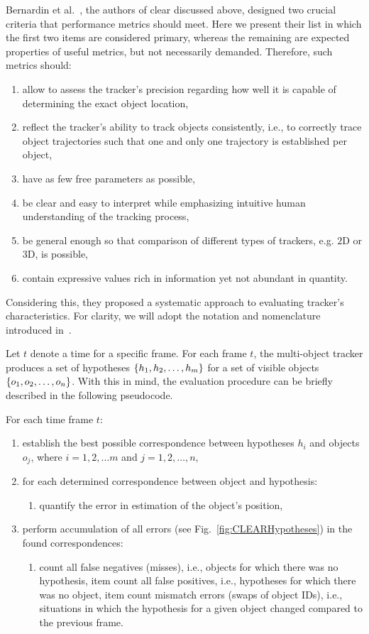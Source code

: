 Bernardin et al.~\cite{Bernardin2008}, the authors of \gls{clear} discussed above, designed two crucial criteria that performance metrics should meet. Here we present their list in which the first two items are considered primary, whereas the remaining are expected properties of useful metrics, but not necessarily demanded. Therefore, such metrics should:
\begin{enumerate}
    \item allow to assess the tracker's precision regarding how well it is capable of determining the exact object location,
    \item reflect the tracker's ability to track objects consistently, i.e., to correctly trace object trajectories such that one and only one trajectory is established per object,
    \item have as few free parameters as possible,
    \item be clear and easy to interpret while emphasizing intuitive human understanding of the tracking process,
    \item be general enough so that comparison of different types of trackers, e.g. $2$D or $3$D, is possible,
    \item contain expressive values rich in information yet not abundant in quantity.
\end{enumerate}

Considering this, they proposed a systematic approach to evaluating tracker's characteristics. For clarity, we will adopt the notation and nomenclature introduced in~\cite{Bernardin2008}.

Let $t$ denote a time for a specific frame. For each frame $t$, the multi-object tracker produces a set of hypotheses $\left\{ {h_1, h_2, \dots, h_m} \right\}$ for a set of visible objects $\left\{ {o_1, o_2, \dots, o_n} \right\}$. With this in mind, the evaluation procedure can be briefly described in the following pseudocode.

For each time frame $t$:
\begin{enumerate}
    \item establish the best possible correspondence between hypotheses $h_i$ and objects $o_j$, where $i = 1, 2, \dots m$ and $j = 1, 2, \dots, n$,
    \item for each determined correspondence between object and hypothesis:
    \begin{enumerate}
        \item quantify the error in estimation of the object's position,
    \end{enumerate}
    \item perform accumulation of all errors (see Fig.~\ref{fig:CLEARHypotheses}) in the found correspondences:
    \begin{enumerate}
        \item count all false negatives (misses), i.e., objects for which there was no hypothesis,
        item count all false positives, i.e., hypotheses for which there was no object,
        item count mismatch errors (swaps of object IDs), i.e., situations in which the hypothesis for a given object changed compared to the previous frame.
    \end{enumerate}
\end{enumerate}


